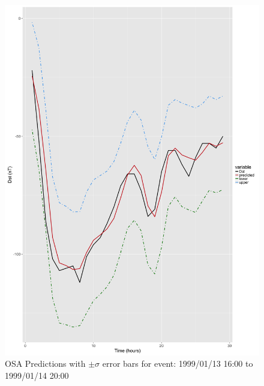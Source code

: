 \documentclass[sw, draft]{AGUTeX}
\begin{document}
\begin{figure}
\noindent\includegraphics[width=\textwidth]{PredictionsModel1/PredErrBars_Storm9.png}
\caption{OSA Predictions with $\pm \sigma$ error bars for event: 1999/01/13 16:00 to 1999/01/14 20:00}
\label{fig:ComparePred3}
\end{figure}


%
%
\end{document}
